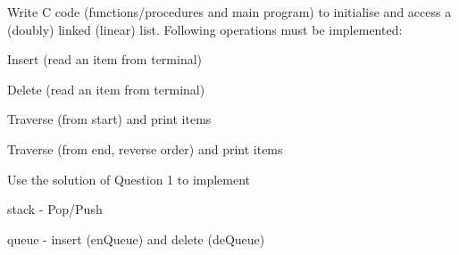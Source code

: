 
\begin{DoxyEnumerate}
\item Write C code (functions/procedures and main program) to initialise and access a (doubly) linked (linear) list. Following operations must be implemented\+:
\begin{DoxyItemize}
\item Insert (read an item from terminal)
\item Delete (read an item from terminal)
\item Traverse (from start) and print items
\item Traverse (from end, reverse order) and print items
\end{DoxyItemize}
\item Use the solution of Question 1 to implement
\begin{DoxyItemize}
\item stack -\/ Pop/\+Push
\item queue -\/ insert (en\+Queue) and delete (de\+Queue) 
\end{DoxyItemize}
\end{DoxyEnumerate}